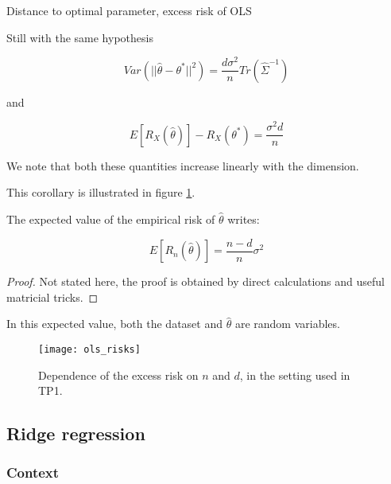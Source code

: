 \documentclass[
10pt, %
a4paper, %
oneside, %
headinclude,footinclude, %
BCOR5mm, %
]{scrartcl}
\begin{document}
\begin{corollary}{Distance to optimal parameter, excess risk of OLS}

    Still with the same hypothesis

    \begin{equation*}
	Var(|| \hat{\theta}-\theta^*||^2) = \frac{d\sigma^2}{n} Tr(\hat{\Sigma}^{-1})
    \end{equation*}

    and

    \begin{equation*}
	E[R_X( \hat{\theta})]-R_X( \theta^*) = \frac{\sigma ^2d}{n} 
    \end{equation*}

    We note that both these quantities increase linearly with the dimension.
\end{corollary}

This corollary is illustrated in figure \ref{fig:olsrisk}.

\begin{proposition}
    The expected value of the empirical risk of $ \hat{\theta}$ writes:

    \begin{equation}
	E[ R_n( \hat{\theta})] = \frac{n-d}{n} \sigma^2
    \end{equation}
\end{proposition}

\begin{proof}
Not stated here, the proof is obtained by direct calculations and useful matricial tricks.
\end{proof}

\begin{remark}
    In this expected value, both the dataset and $ \hat{\theta}$ are random variables.
\end{remark}

\begin{figure}[htpb]
    \centering
    \texttt{[image: ols\_risks]}
    \caption{Dependence of the excess risk on $n$ and $d$, in the setting used
    in TP1.}
    \label{fig:olsrisk}
\end{figure}

\subsection{\large\color{MidnightBlue}Ridge regression}

\subsubsection{\large\color{Periwinkle}Context}
\end{document}
